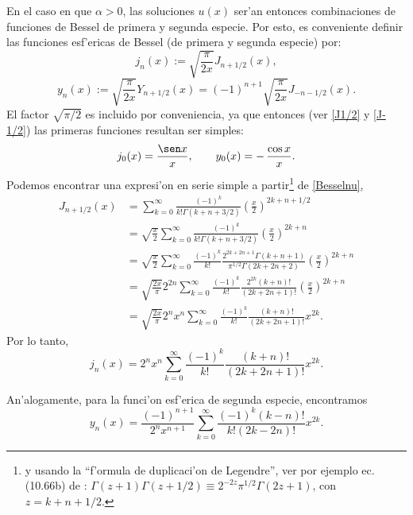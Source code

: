 En el caso en que $\alpha>0$, las soluciones $u(x)$ ser'an entonces combinaciones de funciones de Bessel de primera y segunda especie. Por esto, es conveniente definir las funciones esf'ericas de Bessel (de primera y segunda especie) por:
\begin{equation}
j_{n}(x) := \sqrt{\frac{\pi}{2x}} J_{n+1/2}(x),
\end{equation}
\begin{equation}
y_{n}(x) := \sqrt{\frac{\pi}{2x}} Y_{n+1/2}(x) = (-1)^{n+1} \sqrt{\frac{\pi}{2x}} J_{-n-1/2}(x).
\end{equation}
El factor $\sqrt{\pi/2}$ es incluido por conveniencia, ya que entonces (ver \eqref{J1/2} y \eqref{J-1/2}) las primeras funciones resultan ser simples:
\begin{equation}\label{j0n0}
j_0(x) = \frac{\sen x}{x}, \qquad y_0(x)=-\,\frac{\cos x} {x}.
\end{equation}
Podemos encontrar una expresi'on en serie simple a partir\footnote{y usando la ``f'ormula de duplicaci'on de Legendre'', ver por ejemplo ec. (10.66b) de \cite{Arfken}: $\Gamma(z+1)\Gamma(z+1/2)\equiv 2^{-2z}\pi^{1/2}\Gamma(2z+1)$, con $z=k+n+1/2$.} de \eqref{Besselnu},
\begin{align}
J_{n+1/2} (x)&= \sum_{k = 0}^\infty \frac{ (-1)^k }{ k! \Gamma(k + n + 3/2) }
\left( \frac{x}{2} \right)^{2k+n+1/2} \\
&=\sqrt{\frac{x}{2}} \sum_{k=0}^\infty \frac{ (-1)^k }{ k! \Gamma(k + n + 3/2) }
\left( \frac{x}{2} \right)^{2k+n} \\
&=\sqrt{\frac{x}{2}} \sum_{k=0}^\infty \frac{ (-1)^k }{ k!}\frac{2^{2k+2n+1}\Gamma(k+n+1)}{\pi^{1/2}\Gamma(2k+2n+2)}
\left( \frac{x}{2} \right)^{2k+n} \\
&=\sqrt{\frac{2x}{\pi}} 2^{2n}\sum_{k=0}^\infty \frac{(-1)^k }{k!}\frac{2^{2k}(k+n)!}{(2k+2n+1)!}\left(\frac{x}{2}\right)^{2k+n} \\
&=\sqrt{\frac{2x}{\pi}} 2^n x^n\sum_{k=0}^\infty \frac{(-1)^k}{k!}\frac{(k+n)!}{(2k+2n+1)!}x^{2k} .
\end{align}
Por lo tanto,
\begin{equation}
\boxed{j_n(x)=2^n x^n\sum_{k=0}^\infty \frac{(-1)^k}{k!}\frac{(k+n)!}{(2k+2n+1)!}x^{2k} .}
\end{equation}

An'alogamente, para la funci'on esf'erica de segunda especie, encontramos
\begin{equation}
\boxed{y_n(x)=\frac{(-1)^{n+1}}{2^nx^{n+1}}\sum_{k=0}^\infty \frac{(-1)^k(k-n)!}{k!(2k-2n)!}x^{2k} .}
\end{equation}

